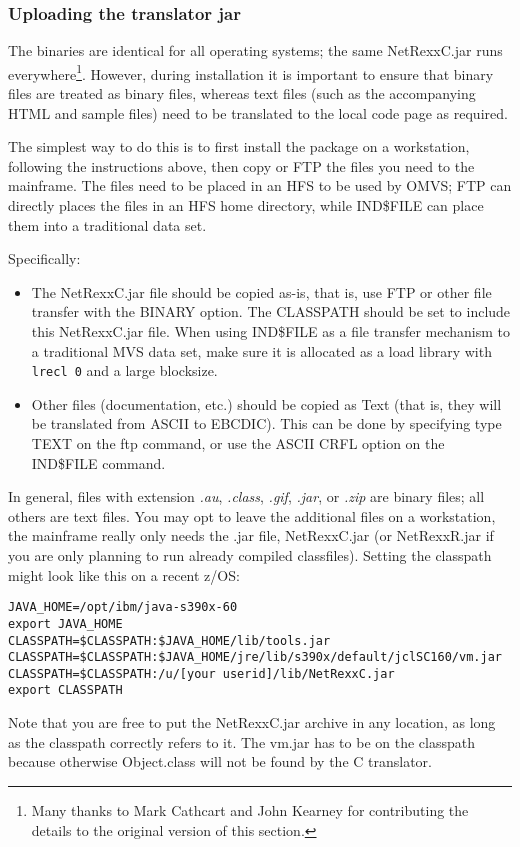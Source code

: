 \subsubsection{Uploading the \nr translator jar}

The \nr{} binaries are identical for all operating systems; the same
NetRexxC.jar runs everywhere\footnote{Many thanks to Mark Cathcart
  and John Kearney for contributing the details to the original version of this section.}.
However, during installation it is important to ensure that binary files
are treated as binary files, whereas text files (such as the
accompanying HTML and sample files) need to be translated to the local code
page as required. 

The simplest way to do this is to first install the package on a
workstation, following the instructions above, then copy or FTP the
files you need to the mainframe.  The files need to be placed in an
HFS to be used by OMVS; FTP can directly places the files in an HFS
home directory, while IND\$FILE can place them into a traditional data
set.

Specifically:
\begin{itemize}
\item The NetRexxC.jar file should be copied as-is, that is, use
FTP or other file transfer with the BINARY option.  The CLASSPATH should
be set to include this NetRexxC.jar file. When using IND\$FILE as a
file transfer mechanism to a traditional MVS data set, make sure it is
allocated as a load library with \texttt{lrecl 0} and a large blocksize.
\item Other files (documentation, etc.) should be copied as Text (that is,
they will be translated from ASCII to EBCDIC). This can be done by specifying type TEXT on the ftp
command, or use the ASCII CRFL option on the IND\$FILE command.
\end{itemize}

In general, files with extension \emph{.au}, \emph{.class}, \emph{.gif}, \emph{.jar},
or \emph{.zip} are binary files; all others are text files. You may
opt to leave the additional files on a workstation, the mainframe
really only needs the .jar file, NetRexxC.jar (or NetRexxR.jar if you
are only planning to run already compiled classfiles).
Setting the classpath might look like this on a recent z/OS:
\begin{verbatim}
JAVA_HOME=/opt/ibm/java-s390x-60
export JAVA_HOME
CLASSPATH=$CLASSPATH:$JAVA_HOME/lib/tools.jar
CLASSPATH=$CLASSPATH:$JAVA_HOME/jre/lib/s390x/default/jclSC160/vm.jar
CLASSPATH=$CLASSPATH:/u/[your userid]/lib/NetRexxC.jar
export CLASSPATH
\end{verbatim}
Note that you are free to put the NetRexxC.jar archive in any
location, as long as the classpath correctly refers to it. The vm.jar
has to be on the classpath because otherwise Object.class will not be
found by the \nr{}C translator.

